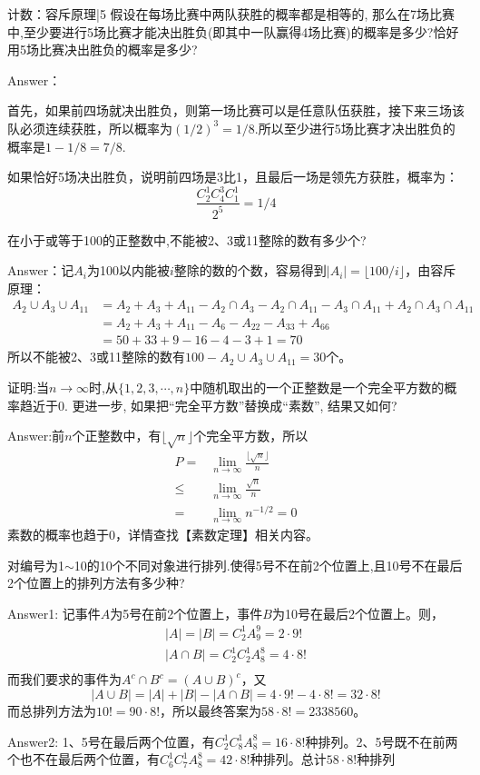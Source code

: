 \newChapter 计数\uppercase\expandafter{}：容斥原理|5
\exer 假设在每场比赛中两队获胜的概率都是相等的, 那么在7场比赛中,至少要进行5场比赛才能决出胜负(即其中一队赢得4场比赛)的概率是多少?恰好用5场比赛决出胜负的概率是多少?\par
Answer：\par 
首先，如果前四场就决出胜负，则第一场比赛可以是任意队伍获胜，接下来三场该队必须连续获胜，所以概率为$(1/2)^3=1/8$.所以至少进行5场比赛才决出胜负的概率是$1-1/8=7/8$.\par
如果恰好5场决出胜负，说明前四场是3比1，且最后一场是领先方获胜，概率为：
\[\frac{C_2^1C_4^3C_1^1}{2^5}=1/4\]

\exer 在小于或等于100的正整数中,不能被2、3或11整除的数有多少个?\par
Answer：记$A_i$为100以内能被$i$整除的数的个数，容易得到$|A_i|=\lfloor 100/i\rfloor$，由容斥原理：
\begin{align*}
A_2\cup A_3\cup A_{11} &= A_2+A_3+A_{11} - A_2\cap A_3 - A_2\cap A_{11} - A_3\cap A_{11} + A_2\cap A_3\cap A_{11} \\
&= A_2+A_3+A_{11} - A_6 - A_{22} - A_{33} + A_{66} \\
&=50+33+9-16-4-3+1=70
\end{align*}
所以不能被2、3或11整除的数有$100 - A_2\cup A_3\cup A_{11} = 30$个。

\exer 证明:当$n\to\infty$时,从$\{1,2,3,\cdots,n\}$中随机取出的一个正整数是一个完全平方数的概率趋近于0. 更进一步, 如果把“完全平方数”替换成“素数”, 结果又如何?\par
Answer:前$n$个正整数中，有$\lfloor\sqrt n\rfloor$个完全平方数，所以
\begin{align*}
P=&\lim_{n\to\infty}\frac{\lfloor\sqrt n\rfloor}{n} \\
\le&\lim_{n\to\infty}\frac{\sqrt n}{n} \\
=&\lim_{n\to\infty}n^{-1/2}=0
\end{align*}
素数的概率也趋于0，详情查找【素数定理】相关内容。

\exer 对编号为1$\sim$10的10个不同对象进行排列.使得5号不在前2个位置上,且10号不在最后2个位置上的排列方法有多少种?\par
Answer1: 记事件$A$为5号在前2个位置上，事件$B$为10号在最后2个位置上。则，
\begin{gather*}
    |A|=|B|=C_2^1A_9^9=2\cdot9!\\
    |A\cap B|=C_2^1C_2^1A_8^8=4\cdot8! \\
\end{gather*}
而我们要求的事件为$A^c\cap B^c=(A\cup B)^c$，又
\[|A\cup B|=|A|+|B|-|A\cap B|=4\cdot9!-4\cdot8!=32\cdot8!\]
而总排列方法为$10!=90\cdot8!$，所以最终答案为$58\cdot8!=2338560$。\par
Answer2: 1、5号在最后两个位置，有$C_2^1C_8^1A_8^8=16\cdot8!$种排列。2、5号既不在前两个也不在最后两个位置，有$C_6^1C_7^1A_8^8=42\cdot8!$种排列。总计$58\cdot8!$种排列

